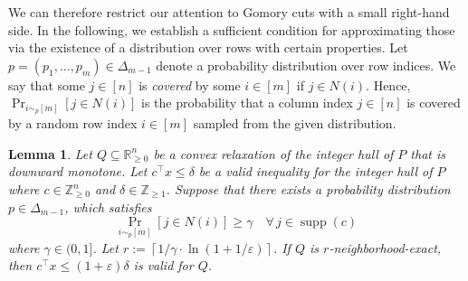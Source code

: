 \documentclass[11pt]{article}
\newcommand{\jiayetodo}[1]{\todo[backgroundcolor=greentransparent, linecolor=green!80]{#1}}
\newcommand{\R}{\mathbb{R}}
\newcommand{\Z}{\mathbb{Z}}
\newcommand{\zero}{\mathbf{0}}
\newcommand{\ceil}[1]{\left\lceil #1 \right\rceil}
\DeclareMathOperator{\supp}{supp}
\newcommand{\proba}{\Pr}
\newcommand{\eps}{\varepsilon}
\newcommand{\numrounds}{t}
\newcommand{\rhs}{\delta}
\newcommand{\covproba}{\gamma}
\newcommand{\numrows}{r}
\newtheorem{lemma}[theorem]{Lemma}
\newcommand{\sam}[1]{{\color{magenta}Sam: {#1} }}
\theoremstyle{remark}
\begin{document}

We can therefore restrict our attention to Gomory cuts with a small right-hand side. In the following,
we establish a sufficient condition for approximating those via the existence of a distribution
over rows with certain properties.
Let $p = (p_1,\dotsc,p_m) \in\Delta_{m-1}$ denote a probability distribution over row indices. We say that some $j \in [n]$ is \emph{covered} by some $i \in [m]$ if $j \in N(i)$. Hence, $\proba_{i \sim_p [m]} [j \in N(i)]$ is the probability that a column index $j \in [n]$ is covered by a random row index $i \in [m]$ sampled from the given distribution.

\begin{lemma} \label{lem:averaging}
	Let $Q \subseteq \R^n_{\ge 0}$ be a convex relaxation of the integer hull of $P$ that is downward monotone. Let $c^\intercal x \le \rhs$ be a valid inequality for the integer hull of $P$ where $c \in \Z^n_{\ge 0}$ and $\rhs \in \Z_{\ge 1}$. Suppose that there exists a probability distribution $p\in \Delta_{m-1}$, which satisfies
\begin{equation}\label{eq:lower-bound-distribution}
	\proba_{i \sim_p [m]} [j \in N(i)] \ge \covproba \quad \forall\,j \in \supp(c) 
\end{equation}
where $\gamma\in (0,1]$.
Let $\numrows := \ceil{1/\covproba \cdot \ln (1+1/\eps)}$. If $Q$ is $\numrows$-neighborhood-exact, then $c^\intercal x \le (1+\eps) \rhs$ is valid for $Q$.
\end{lemma}

\end{document}
